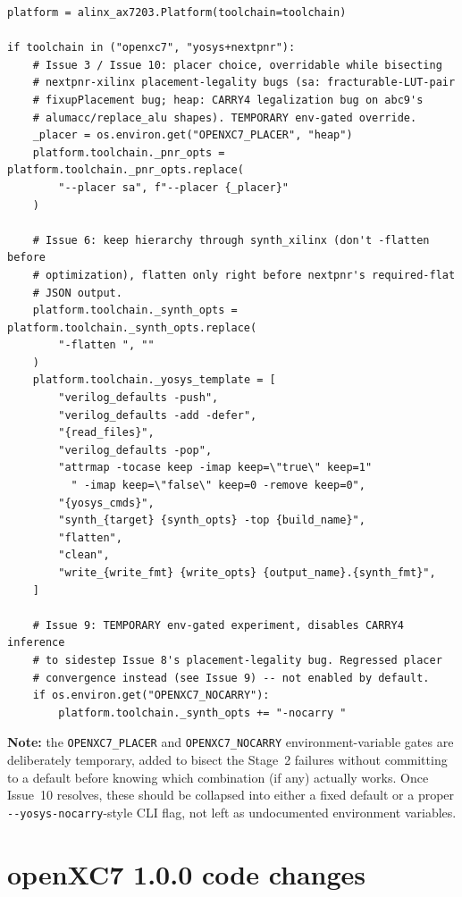 \documentclass[11pt]{article}
\begin{document}
\begin{lstlisting}[style=codeblk]
platform = alinx_ax7203.Platform(toolchain=toolchain)

if toolchain in ("openxc7", "yosys+nextpnr"):
    # Issue 3 / Issue 10: placer choice, overridable while bisecting
    # nextpnr-xilinx placement-legality bugs (sa: fracturable-LUT-pair
    # fixupPlacement bug; heap: CARRY4 legalization bug on abc9's
    # alumacc/replace_alu shapes). TEMPORARY env-gated override.
    _placer = os.environ.get("OPENXC7_PLACER", "heap")
    platform.toolchain._pnr_opts = platform.toolchain._pnr_opts.replace(
        "--placer sa", f"--placer {_placer}"
    )

    # Issue 6: keep hierarchy through synth_xilinx (don't -flatten before
    # optimization), flatten only right before nextpnr's required-flat
    # JSON output.
    platform.toolchain._synth_opts = platform.toolchain._synth_opts.replace(
        "-flatten ", ""
    )
    platform.toolchain._yosys_template = [
        "verilog_defaults -push",
        "verilog_defaults -add -defer",
        "{read_files}",
        "verilog_defaults -pop",
        "attrmap -tocase keep -imap keep=\"true\" keep=1"
          " -imap keep=\"false\" keep=0 -remove keep=0",
        "{yosys_cmds}",
        "synth_{target} {synth_opts} -top {build_name}",
        "flatten",
        "clean",
        "write_{write_fmt} {write_opts} {output_name}.{synth_fmt}",
    ]

    # Issue 9: TEMPORARY env-gated experiment, disables CARRY4 inference
    # to sidestep Issue 8's placement-legality bug. Regressed placer
    # convergence instead (see Issue 9) -- not enabled by default.
    if os.environ.get("OPENXC7_NOCARRY"):
        platform.toolchain._synth_opts += "-nocarry "
\end{lstlisting}

\noindent\textbf{Note:} the \lstinline{OPENXC7_PLACER} and
\lstinline{OPENXC7_NOCARRY} environment-variable gates are deliberately
temporary, added to bisect the Stage~2 failures without committing to a
default before knowing which combination (if any) actually works. Once
Issue~10 resolves, these should be collapsed into either a fixed default
or a proper \lstinline{--yosys-nocarry}-style CLI flag, not left as
undocumented environment variables.

\section{openXC7 1.0.0 code changes}
\label{app:v100}
\end{document}
